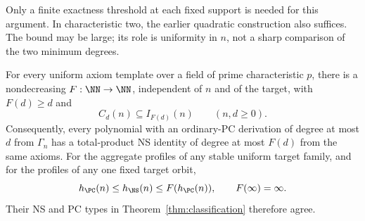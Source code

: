 Only a finite exactness threshold at each fixed support is needed for
this argument. In characteristic two, the earlier quadratic construction also suffices. The
bound may be large; its role is uniformity in $n$, not a sharp comparison
of the two minimum degrees.

\begin{theorem}\label{thm:comparison}
For every uniform axiom template over a field of prime characteristic
$p$, there is a nondecreasing $F:\NN\to\NN$, independent of $n$ and of
the target, with $F(d)\ge d$ and
\begin{equation}\label{eq:whole-comparison}
                              C_d(n)\subseteq I_{F(d)}(n)
                       \qquad(n,d\ge0).
\end{equation}
Consequently, every polynomial with an ordinary-PC derivation of degree
at most $d$ from $\Gamma_n$ has a total-product NS identity of degree at
most $F(d)$ from the same axioms. For the aggregate profiles of any
stable uniform target family, and for the profiles of any one fixed
target orbit,
\begin{equation}\label{eq:target-comparison}
                      h_{\PC}(n)\le h_{\NS}(n)\le F(h_{\PC}(n)),
                      \qquad F(\infty)=\infty.
\end{equation}
Their NS and PC types in Theorem~\ref{thm:classification} therefore agree.
\end{theorem}
